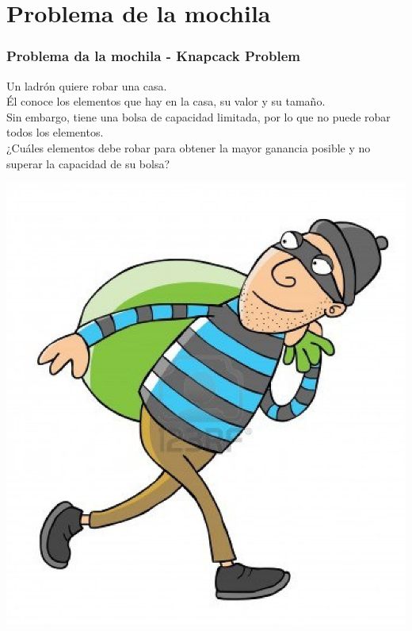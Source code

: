 \documentclass{beamer}
\begin{document}
\section{Problema de la mochila}
	\begin{frame}
		\frametitle{Problema da la mochila - Knapcack Problem}
		Un ladrón quiere robar una casa.\\
		Él conoce los elementos que hay en la casa, su valor y su tamaño.\\
		Sin embargo, tiene una bolsa de capacidad limitada, por lo que no puede robar todos los elementos.\\
		¿Cuáles elementos debe robar para obtener la mayor ganancia posible y no superar la capacidad de su bolsa?\\
		\begin{center} \includegraphics[height = 0.4\textheight]{thief.jpg} \end{center}
	\end{frame}
\end{document}
